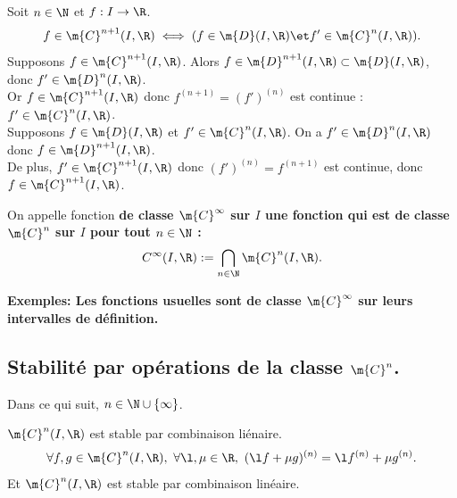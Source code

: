 \documentclass[11pt]{article}
\begin{document}
\begin{prop}{}{}
    Soit $n\in\N$ et $f:I\to\R$.
    \begin{equation*}
        f\in\m{C}^{n+1}(I,\R) \iff (f \in \m{D}(I,\R) \et f'\in\m{C}^n(I,\R)).
    \end{equation*}
    \tcblower
    \boxed{\ra} Supposons $f\in\m{C}^{n+1}(I,\R)$. Alors $f\in\m{D}^{n+1}(I,\R)\subset\m{D}(I,\R)$, donc $f'\in\m{D}^n(I,\R)$.\\
    Or $f\in\m{C}^{n+1}(I,\R)$ donc $f^{(n+1)}=(f')^{(n)}$ est continue : $f'\in\m{C}^n(I,\R)$.\\
    \boxed{\la} Supposons $f\in\m{D}(I,\R)$ et $f'\in\m{C}^n(I,\R)$. On a $f'\in\m{D}^{n}(I,\R)$ donc $f\in\m{D}^{n+1}(I,\R)$.\\
    De plus, $f'\in\m{C}^{n+1}(I,\R)$ donc $(f')^{(n)}=f^{(n+1)}$ est continue, donc $f\in\m{C}^{n+1}(I,\R)$.
\end{prop}

\begin{defi}{}{}
    On appelle fonction \bf{de classe} $\m{C}^{\infty}$ sur $I$ une fonction qui est de classe $\m{C}^n$ sur $I$ pour tout $n\in\N$ :
    \begin{equation*}
        C^{\infty}(I,\R):=\bigcap_{n\in\N}\m{C}^n(I,\R).
    \end{equation*}
\end{defi}

\bf{Exemples:} Les fonctions usuelles sont de classe $\m{C}^{\infty}$ sur leurs intervalles de définition.

\subsection{Stabilité par opérations de la classe \texorpdfstring{$\m{C}^n$}{Lg}.}

Dans ce qui suit, $n\in\N\cup\{\infty\}$.

\begin{prop}{$\m{C}^n(I,\R)$ est stable par combinaison liénaire.}{}
    \begin{equation*}
        \forall f, g \in \m{C}^n(I,\R), ~ \forall \l, \mu \in \R, ~ (\l f + \mu g)^{(n)}=\l f^{(n)} + \mu g^{(n)}.
    \end{equation*}
    Et $\m{C}^n(I,\R)$ est stable par combinaison linéaire.
\end{prop}

\vspace*{-0.4cm}
\end{document}

